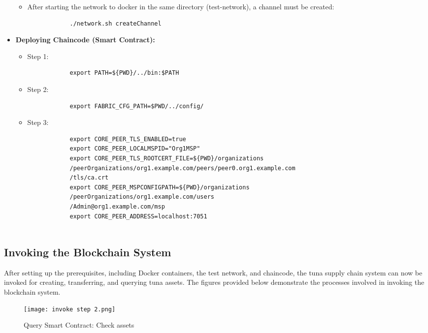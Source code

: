 \begin{itemize}
\begin{itemize}
		\item After starting the network to docker in the same directory (test-network), a channel must be created:
		\begin{verbatim}
			./network.sh createChannel
		\end{verbatim}
		
	\end{itemize}
	
	\item \textbf{Deploying Chaincode (Smart Contract):}
	\begin{itemize}
		\item Step 1:
		\begin{verbatim}
			export PATH=${PWD}/../bin:$PATH
		\end{verbatim}
		
		\item Step 2:
		\begin{verbatim}
			export FABRIC_CFG_PATH=$PWD/../config/
		\end{verbatim}
		
		\item Step 3:
		\begin{verbatim}
			export CORE_PEER_TLS_ENABLED=true
			export CORE_PEER_LOCALMSPID="Org1MSP"
			export CORE_PEER_TLS_ROOTCERT_FILE=${PWD}/organizations
			/peerOrganizations/org1.example.com/peers/peer0.org1.example.com
			/tls/ca.crt
			export CORE_PEER_MSPCONFIGPATH=${PWD}/organizations
			/peerOrganizations/org1.example.com/users
			/Admin@org1.example.com/msp
			export CORE_PEER_ADDRESS=localhost:7051
			
		\end{verbatim}
		
	\end{itemize}
	
	
\end{itemize}

\subsection{Invoking the Blockchain System}

After setting up the prerequisites, including Docker containers, the test network, and chaincode, the tuna supply chain system can now be invoked for creating, transferring, and querying tuna assets. The figures provided below demonstrate the processes involved in invoking the blockchain system.

\begin{figure}[H]
	\centering
	\texttt{[image: invoke step 2.png]}
	\caption{Query Smart Contract: Check assets}
	\label{fig: second step}
\end{figure}

